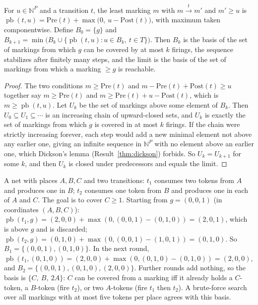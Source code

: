 \begin{established}\label{thm:backward}
For $u\in\mathbb N^P$ and a transition $t$, the least marking $m$ with $m\xrightarrow{t}m'$ and $m'\ge u$ is $\operatorname{pb}(t,u)=\mathrm{Pre}(t)+\max\bigl(0,\ u-\mathrm{Post}(t)\bigr)$, with maximum taken componentwise. Define $B_0=\{g\}$ and $B_{k+1}=\min\bigl(B_k\cup\{\operatorname{pb}(t,u):u\in B_k,\ t\in T\}\bigr)$. Then $B_k$ is the basis of the set of markings from which $g$ can be covered by at most $k$ firings, the sequence stabilizes after finitely many steps, and the limit is the basis of the set of markings from which a marking $\ge g$ is reachable.
\end{established}
\begin{proof}
The two conditions $m\ge\mathrm{Pre}(t)$ and $m-\mathrm{Pre}(t)+\mathrm{Post}(t)\ge u$ together say $m\ge\mathrm{Pre}(t)$ and $m\ge\mathrm{Pre}(t)+u-\mathrm{Post}(t)$,
which is $m\ge\operatorname{pb}(t,u)$. Let $U_k$ be the set of markings above some element of $B_k$. Then $U_0\subseteq U_1\subseteq\cdots$ is an increasing chain of upward-closed sets, and $U_k$ is exactly the set of markings from which $g$ is covered in at most $k$ firings. If the chain were strictly increasing forever, each step would add a new minimal element not above any earlier one, giving an infinite sequence in $\mathbb N^P$ with no element above an earlier one, which Dickson's lemma (Result~\ref{thm:dickson}) forbids. So $U_k=U_{k+1}$ for some $k$, and then $U_k$ is closed under predecessors and equals the limit.
\end{proof}

\begin{example}\label{ex:two-coins}
A net with places $A,B,C$ and two transitions: $t_1$ consumes two tokens from $A$ and produces one in $B$; $t_2$ consumes one token from $B$ and produces one in each of $A$ and $C$. The goal is to cover $C\ge1$. Starting from $g=(0,0,1)$ (in coordinates $(A,B,C)$): $\operatorname{pb}(t_1,g)=(2,0,0)+\max(0,(0,0,1)-(0,1,0))=(2,0,1)$, which is above $g$ and is discarded; $\operatorname{pb}(t_2,g)=(0,1,0)+\max(0,(0,0,1)-(1,0,1))=(0,1,0)$. So $B_1=\{(0,0,1),(0,1,0)\}$. In the next round, $\operatorname{pb}(t_1,(0,1,0))=(2,0,0)+\max(0,(0,1,0)-(0,1,0))=(2,0,0)$, and $B_2=\{(0,0,1),(0,1,0),(2,0,0)\}$. Further rounds add nothing, so the basis is $\{C,\ B,\ 2A\}$: $C$ can be covered from a marking iff it already holds a $C$-token, a $B$-token (fire $t_2$), or two $A$-tokens (fire $t_1$ then $t_2$). A brute-force search over all markings with at most five tokens per place agrees with this basis.
\end{example}

